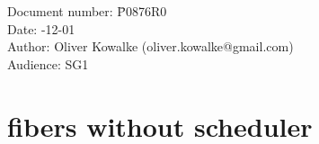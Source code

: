 \documentclass[fontsize=10pt,paper=A4,pagesize,DIV=15]{scrartcl}
\begin{document}
\small
\begin{tabbing}
    Document number: \= P0876R0\\
    Date:            -12-01\\
    Author:          \> Oliver Kowalke (oliver.kowalke@gmail.com)\\
    Audience:        \> SG1\\
\end{tabbing}

\section*{fibers without scheduler}


\tableofcontents






















\end{document}
